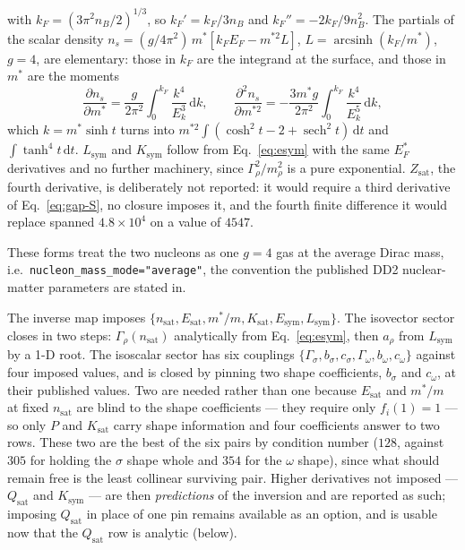 \documentclass[aps,prc,onecolumn,superscriptaddress,nofootinbib,10pt]{revtex4-2}
\newcommand{\nB}{n_B}
\newcommand{\nsat}{n_{\mathrm{sat}}}
\begin{document}
%
with $k_F = (3\pi^2 \nB/2)^{1/3}$, so $k_F' = k_F/3\nB$ and
$k_F'' = -2k_F/9\nB^2$. The partials of the scalar density
$n_s = (g/4\pi^2)\, m^* [k_F E_F - m^{*2} L]$, $L = \operatorname{arcsinh}
(k_F/m^*)$, $g = 4$, are elementary: those in $k_F$ are the integrand at the
surface, and those in $m^*$ are the moments
%
\begin{equation}
\frac{\partial n_s}{\partial m^*}
  = \frac{g}{2\pi^2} \int_0^{k_F} \frac{k^4}{E_k^3}\, \mathrm{d}k ,
\qquad
\frac{\partial^2 n_s}{\partial m^{*2}}
  = -\frac{3 m^* g}{2\pi^2} \int_0^{k_F} \frac{k^4}{E_k^5}\, \mathrm{d}k ,
\end{equation}
%
which $k = m^* \sinh t$ turns into
$m^{*2}\!\int (\cosh^2 t - 2 + \operatorname{sech}^2 t)\,\mathrm{d}t$ and
$\int \tanh^4 t\, \mathrm{d}t$. $L_{\mathrm{sym}}$ and $K_{\mathrm{sym}}$
follow from Eq.~\eqref{eq:esym} with the same $E^*_F$ derivatives and no
further machinery, since $\Gamma_\rho^2/m_\rho^2$ is a pure exponential.
$Z_{\mathrm{sat}}$, the fourth derivative, is deliberately not reported: it
would require a third derivative of Eq.~\eqref{eq:gap-S}, no closure imposes
it, and the fourth finite difference it would replace spanned
$4.8\times 10^{4}$ on a value of $4547$.

These forms treat the two nucleons as one $g = 4$ gas at the average Dirac
mass, i.e.\ \texttt{nucleon\_mass\_mode="average"}, the convention the
published DD2 nuclear-matter parameters are stated in.

The inverse map imposes $\{\nsat, E_{\mathrm{sat}}, m^*/m, K_{\mathrm{sat}},
E_{\mathrm{sym}}, L_{\mathrm{sym}}\}$. The isovector sector closes in two
steps: $\Gamma_\rho(\nsat)$ analytically from Eq.~\eqref{eq:esym}, then
$a_\rho$ from $L_{\mathrm{sym}}$ by a 1-D root. The isoscalar sector has six
couplings $\{\Gamma_\sigma, b_\sigma, c_\sigma, \Gamma_\omega, b_\omega,
c_\omega\}$ against four imposed values, and is closed by pinning two shape
coefficients, $b_\sigma$ and $c_\omega$, at their published values. Two are
needed rather than one because $E_{\mathrm{sat}}$ and $m^*/m$ at fixed
$\nsat$ are blind to the shape coefficients --- they require only $f_i(1) = 1$
--- so only $P$ and $K_{\mathrm{sat}}$ carry shape information and four
coefficients answer to two rows. These two are the best of the six pairs by
condition number ($128$, against $305$ for holding the $\sigma$ shape whole
and $354$ for the $\omega$ shape), since what should remain free is the least
collinear surviving pair. Higher derivatives not imposed ---
$Q_{\mathrm{sat}}$ and $K_{\mathrm{sym}}$ --- are then \emph{predictions} of
the inversion and are reported as such; imposing $Q_{\mathrm{sat}}$ in place
of one pin remains available as an option, and is usable now that the
$Q_{\mathrm{sat}}$ row is analytic (below).
\end{document}

